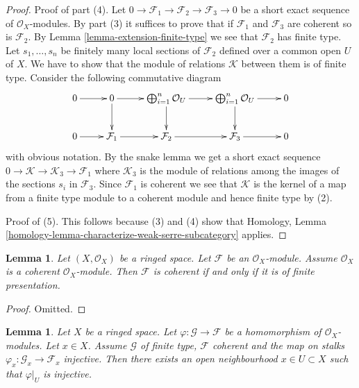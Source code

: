 \documentclass{stacks-project}
\theoremstyle{plain}
\newtheorem{lemma}[subsection]{Lemma}
\theoremstyle{definition}
\theoremstyle{remark}
\numberwithin{equation}{subsection}
\begin{document}
\begin{proof}
\medskip\noindent
Proof of part (4).
Let $0 \to \mathcal{F}_1 \to \mathcal{F}_2 \to \mathcal{F}_3 \to 0$
be a short exact sequence of $\mathcal{O}_X$-modules. By part
(3) it suffices
to prove that if $\mathcal{F}_1$ and $\mathcal{F}_3$ are coherent
so is $\mathcal{F}_2$. By Lemma \ref{lemma-extension-finite-type} we
see that $\mathcal{F}_2$ has finite type. Let
$s_1, \ldots, s_n$ be finitely many local
sections of $\mathcal{F}_2$ defined over a common open $U$ of $X$.
We have to show that the module of relations $\mathcal{K}$
between them is of finite type.
Consider the following commutative diagram
$$
\xymatrix{
0 \ar[r] &
0 \ar[r] \ar[d] &
\bigoplus_{i = 1}^{n} \mathcal{O}_U \ar[r] \ar[d] &
\bigoplus_{i = 1}^{n} \mathcal{O}_U \ar[r] \ar[d] &
0 \\
0 \ar[r] &
\mathcal{F}_1 \ar[r] &
\mathcal{F}_2 \ar[r] &
\mathcal{F}_3 \ar[r] &
0
}
$$
with obvious notation. By the snake lemma
we get a short exact sequence
$0 \to \mathcal{K} \to \mathcal{K}_3 \to \mathcal{F}_1$
where $\mathcal{K}_3$ is the module of relations among
the images of the sections $s_i$ in $\mathcal{F}_3$.
Since $\mathcal{F}_1$ is coherent we see that
$\mathcal{K}$ is the kernel of a map from a finite type module
to a coherent module and hence finite type by (2).

\medskip\noindent
Proof of (5). This follows because (3) and (4) show that
Homology, Lemma \ref{homology-lemma-characterize-weak-serre-subcategory}
applies.
\end{proof}

\begin{lemma}
\label{lemma-coherent-structure-sheaf}
Let $(X, \mathcal{O}_X)$ be a ringed space.
Let $\mathcal{F}$ be an $\mathcal{O}_X$-module.
Assume $\mathcal{O}_X$ is a coherent $\mathcal{O}_X$-module.
Then $\mathcal{F}$ is coherent if and only if it is
of finite presentation.
\end{lemma}

\begin{proof}
Omitted.
\end{proof}

\begin{lemma}
\label{lemma-finite-type-to-coherent-injective-on-stalk}
Let $X$ be a ringed space.
Let $\varphi : \mathcal{G} \to \mathcal{F}$ be a homomorphism
of $\mathcal{O}_X$-modules.
Let $x \in X$. Assume $\mathcal{G}$ of finite type,
$\mathcal{F}$ coherent and the map on stalks
$\varphi_x : \mathcal{G}_x \to \mathcal{F}_x$ injective.
Then there exists an open neighbourhood
$x \in U \subset X$ such that $\varphi|_U$ is injective.
\end{lemma}
\end{document}
